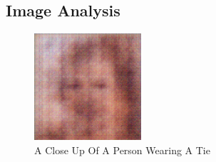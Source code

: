 \documentclass{article}%
\begin{document}
%
\subsection{Image Analysis}%
\label{subsec:ImageAnalysis}%


\begin{figure}[h!]%
\centering%
\includegraphics[width=150px]{500_fake_images/samples_5_92.png}%
\caption{A Close Up Of A Person Wearing A Tie}%
\end{figure}

%
\end{document}
